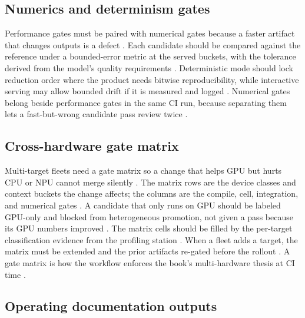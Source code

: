 \subsection{Numerics and determinism gates}

Performance gates must be paired with numerical gates because a faster artifact that changes outputs is a defect \citep{chen2020compilerbasedhardw,patel2025llminference,memoryfloor2026}. Each candidate should be compared against the reference under a bounded-error metric at the served buckets, with the tolerance derived from the model's quality requirements \citep{dao2022flashattention,memoryfloor2026}. Deterministic mode should lock reduction order where the product needs bitwise reproducibility, while interactive serving may allow bounded drift if it is measured and logged \citep{chen2020compilerbasedhardw,patel2025llminference}. Numerical gates belong beside performance gates in the same CI run, because separating them lets a fast-but-wrong candidate pass review twice \citep{memoryfloor2026,patel2025llminference}.

\subsection{Cross-hardware gate matrix}

Multi-target fleets need a gate matrix so a change that helps GPU but hurts CPU or NPU cannot merge silently \citep{chen2020compilerbasedhardw,amd2024aie,memoryfloor2026}. The matrix rows are the device classes and context buckets the change affects; the columns are the compile, cell, integration, and numerical gates \citep{patel2025llminference,amd2024xdna,memoryfloor2026}. A candidate that only runs on GPU should be labeled GPU-only and blocked from heterogeneous promotion, not given a pass because its GPU numbers improved \citep{chen2020compilerbasedhardw,taxbreak2026}. The matrix cells should be filled by the per-target classification evidence from the profiling station \citep{memoryfloor2026,patel2025llminference}. When a fleet adds a target, the matrix must be extended and the prior artifacts re-gated before the rollout \citep{amd2024xdna,taxbreak2026}. A gate matrix is how the workflow enforces the book's multi-hardware thesis at CI time \citep{patel2025llminference,memoryfloor2026}.

\subsection{Operating documentation outputs}

